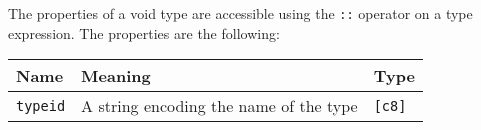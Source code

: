The properties of a void type are accessible using the \texttt{::} operator on a type expression. The properties are the following:

\begin{center}
  \vspace{-5pt}
  \begin{adjustbox}{max width=\linewidth}
    \begin{tabular}{|l|ll|}
      \hline
      Name & Meaning & Type\\[0pt]
      \hline
      \hline
      \texttt{typeid} & A string encoding the name of the type & \texttt{[c8]}\\[0pt]
      \hline
    \end{tabular}
  \end{adjustbox}
\end{center}
